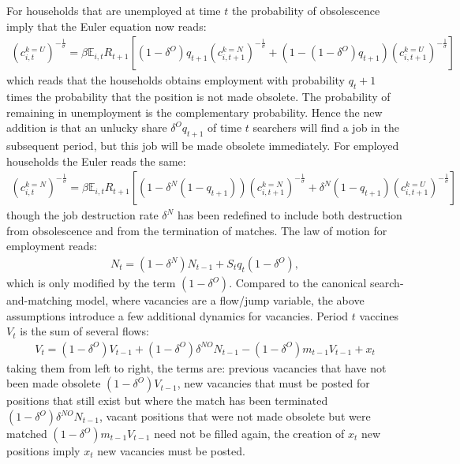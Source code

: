 For households that are unemployed at time $t$ the probability of obsolescence imply that the Euler equation now reads:
\begin{gather*}
\left(c_{i,t}^{k=U}\right)^{-\frac{1}{\sigma}}=\beta\mathbb{E}_{i,t}R_{t+1}\left[\left(1-\delta^{O}\right)q_{t+1}\left(c_{i,t+1}^{k=N}\right)^{-\frac{1}{\sigma}}+\left(1-\left(1-\delta^{O}\right)q_{t+1}\right)\left(c_{i,t+1}^{k=U}\right)^{-\frac{1}{\sigma}}\right]
\end{gather*}
which reads that the households obtains employment with probability $q_t+1$ times the probability that the position is not made obsolete. The probability of remaining in unemployment is the complementary probability. Hence the new addition is that an unlucky share $\delta^{O}q_{t+1}$ of time $t$ searchers will find a job in the subsequent period, but this job will be made obsolete immediately. 
For employed households the Euler reads the same:
\begin{gather*}
\left(c_{i,t}^{k=N}\right)^{-\frac{1}{\sigma}}=\beta\mathbb{E}_{i,t}R_{t+1}\left[\left(1-\delta^{N}\left(1-q_{t+1}\right)\right)\left(c_{i,t+1}^{k=N}\right)^{-\frac{1}{\sigma}}+\delta^{N}\left(1-q_{t+1}\right)\left(c_{i,t+1}^{k=U}\right)^{-\frac{1}{\sigma}}\right]
\end{gather*}
though the job destruction rate $\delta^{N}$ has been redefined to include both destruction from obsolescence and from the termination of matches.  
The law of motion for employment reads:
\begin{gather*}
N_{t}=\left(1-\delta^{N}\right)N_{t-1}+S_{t}q_{t}\left(1-\delta^{O}\right),
\end{gather*}
which is only modified by the term $\left(1-\delta^{O}\right)$. 
Compared to the canonical search-and-matching model, where vacancies are a flow/jump variable, the above assumptions introduce a few additional dynamics for vacancies. Period $t$ vaccines $V_t$ is the sum of several flows: 
\begin{gather*}
V_{t}=\left(1-\delta^{O}\right)V_{t-1}+\left(1-\delta^{O}\right)\delta^{NO}N_{t-1}-\left(1-\delta^{O}\right)m_{t-1}V_{t-1}+x_{t}
\end{gather*}
taking them from left to right, the terms are: previous vacancies that have not been made obsolete $\left(1-\delta^{O}\right)V_{t-1}$, 
new vacancies that must be posted for positions that still exist but where the match has been terminated $\left(1-\delta^{O}\right)\delta^{NO}N_{t-1}$, vacant positions that were not made obsolete but were matched $\left(1-\delta^{O}\right)m_{t-1}V_{t-1}$ need not be filled again, the creation of $x_t$ new positions imply $x_t$ new vacancies must be posted. 

